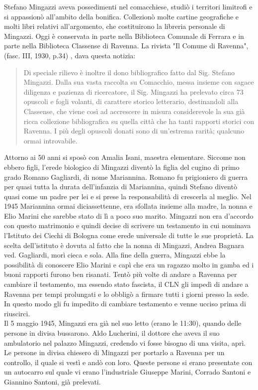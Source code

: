 Stefano Mingazzi aveva possedimenti nel comacchiese, studiò i territori limitrofi e si appassionò all'ambito della bonifica. Collezionò molte cartine geografiche e molti libri relativi all'argomento, che costituirono la libreria personale di Mingazzi. Oggi è conservata in parte nella Biblioteca Comunale di Ferrara e in parte nella Biblioteca Classense di Ravenna. La rivista "Il Comune di Ravenna", (fasc. III, 1930, p.34) , dava questa notizia:
\begin{quotation}
  Di speciale rilievo è inoltre il dono bibliografico fatto dal Sig. Stefano Mingazzi. Dalla sua vasta raccolta su Comacchio, messa insieme con sagace diligenza e pazienza di ricercatore, il Sig. Mingazzi ha prelevato circa 73 opuscoli e fogli volanti, di carattere storico letterario, destinandoli alla Classense, che viene così ad accrescere in misura considerevole la sua già ricca collezione bibliografica su quella città che ha tanti rapporti storici con Ravenna. I più degli opuscoli donati sono di un'estrema rarità; qualcuno ormai introvabile.
\end{quotation}
Attorno ai 50 anni si sposò con Amalia Isani, maestra elementare. Siccome non ebbero figli, l'erede biologico di Mingazzi diventò la figlia del cugino di primo grado  Romano Gagliardi, di nome Mariannina. Romano fu prigioniero di guerra per quasi tutta la durata dell'infanzia di Mariannina, quindi Stefano diventò quasi come un padre per lei e si prese la responsabilità di crescerla al meglio. Nel 1945 Mariannina ormai diciassettenne, era sfollata insieme alla madre, la nonna e Elio Marini che sarebbe stato di lì a poco suo marito. Mingazzi non era d'accordo con questo matrimonio e quindi decise di scrivere un testamento in cui nominava l'Istituto dei Ciechi di Bologna come erede universale di tutte le sue proprietà. La scelta dell'istituto è dovuta al fatto che la nonna di Mingazzi, Andrea Bagnara ved. Gagliardi, morì cieca e sola. Alla fine della guerra, Mingazzi ebbe la possibilità di conoscere Elio Marini e capì che era un ragazzo molto in gamba ed i buoni rapporti furono ben risanati. Tentò più volte di andare a Ravenna per cambiare il testamento, ma essendo stato fascista, il CLN gli impedì di andare a Ravenna per tempi prolungati e lo obbligò a firmare tutti i giorni presso la sede. In questo modo gli fu impedito di cambiare testamento e venne ucciso prima di riuscirci.\\

Il 5 maggio 1945, Mingazzi era già nel suo letto (erano le 11:30), quando delle persone in divisa bussarono. Aldo Lucherini, il dottore che aveva il suo ambulatorio nel palazzo Mingazzi, credendo vi fosse bisogno di una visita, aprì. Le persone in divisa chiesero di Mingazzi per portarlo a Ravenna per un controllo, il quale si vestì e andò con loro. Queste persone si erano presentate con un autocarro sul quale vi erano l'industriale Giuseppe Marini, Corrado Santoni e Giannino Santoni, già prelevati.
\newpage


